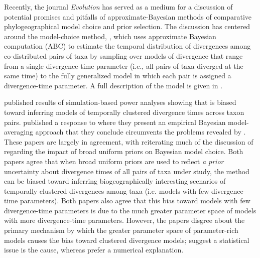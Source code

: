 Recently, the journal \emph{Evolution} has served as a medium for a discussion
of potential promises and pitfalls of approximate-Bayesian methods of
comparative phylogeographical model choice and prior selection.
The discussion has centered around the model-choice method, \msb
\citep{Huang2011}, which uses approximate Bayesian computation (ABC) to
estimate the temporal distribution of divergences among co-distributed pairs of
taxa by sampling over models of divergence that range from a single
divergence-time parameter (i.e., all pairs of taxa diverged at the same time)
to the fully generalized model in which each pair is assigned a divergence-time
parameter.
A full description of the model is given in \citet{Oaks2012}.

\citet{Oaks2012} published results of simulation-based power analyses showing
that \msb is biased toward inferring models of temporally clustered divergence
times across taxon pairs.
\citet{Hickerson2013} published a response to \citet{Oaks2012} where they
present an empirical Bayesian model-averaging approach that they conclude
circumvents the problems revealed by \citet{Oaks2012}.
These papers are largely in agreement, with \citet{Hickerson2013} reiterating
much of the discussion of \citet{Oaks2012} regarding the impact of broad
uniform priors on Bayesian model choice.
Both papers agree that when broad uniform priors are used to reflect \emph{a
prior} uncertainty about divergence times of all pairs of taxa under study,
the method can be biased toward inferring biogeographically interesting
scenarios of temporally clustered divergences among taxa (i.e. models with few
divergence-time parameters).
Both papers also agree that this bias toward models with few divergence-time
parameters is due to the much greater parameter space of models with more
divergence-time parameters.
However, the papers disgree about the primary mechanism by which the greater
parameter space of parameter-rich models causes the bias toward clustered
divergence models;
\citet{Oaks2012} suggest a statistical issue is the cause, whereas
\citep{Hickerson2013} prefer a numerical explanation.

